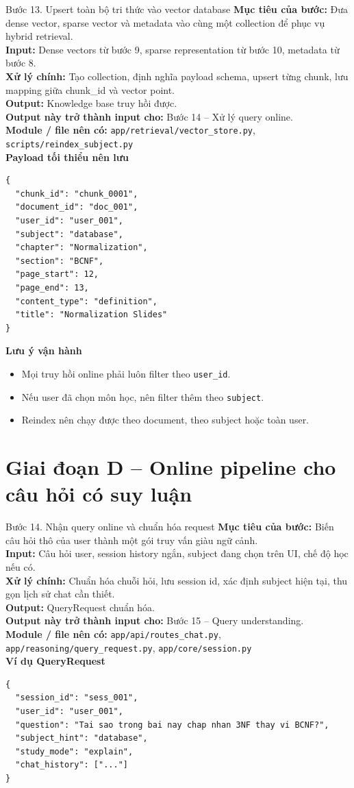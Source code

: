 \documentclass[12pt,a4paper]{article}
\newcommand{\stepgoal}[1]{\textbf{Mục tiêu của bước:} #1\\}
\newcommand{\stepinput}[1]{\textbf{Input:} #1\\}
\newcommand{\stepprocess}[1]{\textbf{Xử lý chính:} #1\\}
\newcommand{\stepoutput}[1]{\textbf{Output:} #1\\}
\newcommand{\stepnext}[1]{\textbf{Output này trở thành input cho:} #1\\}
\newcommand{\stepmodules}[1]{\textbf{Module / file nên có:} #1\\}
\begin{document}
\begin{stepbox}{Bước 13. Upsert toàn bộ tri thức vào vector database}
\stepgoal{Đưa dense vector, sparse vector và metadata vào cùng một collection để phục vụ hybrid retrieval.}
\stepinput{Dense vectors từ bước 9, sparse representation từ bước 10, metadata từ bước 8.}
\stepprocess{Tạo collection, định nghĩa payload schema, upsert từng chunk, lưu mapping giữa chunk\_id và vector point.}
\stepoutput{Knowledge base truy hồi được.}
\stepnext{Bước 14 -- Xử lý query online.}
\stepmodules{\texttt{app/retrieval/vector\_store.py}, \texttt{scripts/reindex\_subject.py}}

\textbf{Payload tối thiểu nên lưu}
\begin{lstlisting}
{
  "chunk_id": "chunk_0001",
  "document_id": "doc_001",
  "user_id": "user_001",
  "subject": "database",
  "chapter": "Normalization",
  "section": "BCNF",
  "page_start": 12,
  "page_end": 13,
  "content_type": "definition",
  "title": "Normalization Slides"
}
\end{lstlisting}

\textbf{Lưu ý vận hành}
\begin{itemize}
    \item Mọi truy hồi online phải luôn filter theo \texttt{user\_id}.
    \item Nếu user đã chọn môn học, nên filter thêm theo \texttt{subject}.
    \item Reindex nên chạy được theo document, theo subject hoặc toàn user.
\end{itemize}
\end{stepbox}

\section{Giai đoạn D -- Online pipeline cho câu hỏi có suy luận}

\begin{stepbox}{Bước 14. Nhận query online và chuẩn hóa request}
\stepgoal{Biến câu hỏi thô của user thành một gói truy vấn giàu ngữ cảnh.}
\stepinput{Câu hỏi user, session history ngắn, subject đang chọn trên UI, chế độ học nếu có.}
\stepprocess{Chuẩn hóa chuỗi hỏi, lưu session id, xác định subject hiện tại, thu gọn lịch sử chat cần thiết.}
\stepoutput{QueryRequest chuẩn hóa.}
\stepnext{Bước 15 -- Query understanding.}
\stepmodules{\texttt{app/api/routes\_chat.py}, \texttt{app/reasoning/query\_request.py}, \texttt{app/core/session.py}}

\textbf{Ví dụ QueryRequest}
\begin{lstlisting}
{
  "session_id": "sess_001",
  "user_id": "user_001",
  "question": "Tai sao trong bai nay chap nhan 3NF thay vi BCNF?",
  "subject_hint": "database",
  "study_mode": "explain",
  "chat_history": ["..."]
}
\end{lstlisting}
\end{stepbox}
\end{document}
